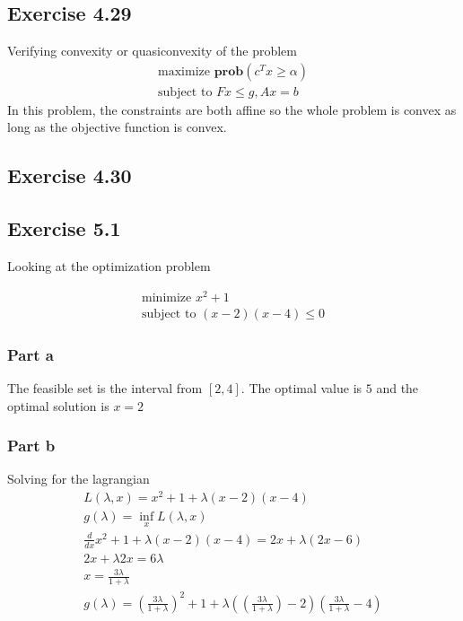 \subsection{Exercise 4.29}
Verifying convexity or quasiconvexity of the problem 
\begin{equation}
  \begin{aligned}
    \text{maximize } \textbf{prob}(c^T x \geq \alpha) \\
    \text{subject to } Fx \leq g, Ax = b
  \end{aligned}
\end{equation}
In this problem, the constraints are both affine so the whole problem is convex as long as the objective function is convex.

\subsection{Exercise 4.30}

\subsection{Exercise 5.1}
Looking at the optimization problem

\begin{equation}
  \begin{aligned}
    \text{minimize } x^2 +1 \\
    \text{subject to } (x-2)(x-4) \leq 0
  \end{aligned}
\end{equation}
\subsubsection{Part a}
The feasible set is the interval from $[2,4]$. The optimal value is $5$ and the optimal solution is $x=2$ 

\subsubsection{Part b}
Solving for the lagrangian
\begin{equation}
  \begin{aligned}
    L(\lambda, x) = x^2+1 + \lambda (x-2)(x-4) \\
    g(\lambda) = \inf_x L(\lambda, x) \\
    \frac{d }{d x} x^2+1 + \lambda(x-2)(x-4) = 2x + \lambda(2x -6) \\
    2x + \lambda 2x = 6\lambda \\
    x = \frac{3\lambda}{1+\lambda} \\ 
    g(\lambda) = (\frac{3\lambda}{1+\lambda})^2 + 1 + \lambda( (\frac{3\lambda}{1+\lambda}) -2 )(\frac{3\lambda}{1+\lambda} -4)
  \end{aligned}
\end{equation}


